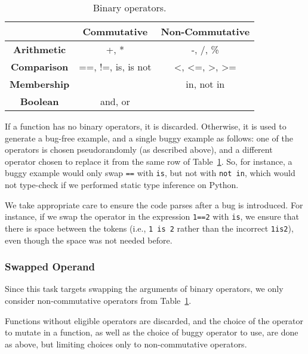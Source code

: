 \documentclass{article}
\begin{document}
\begin{table}
\centering
\begin{tabular}{|c|c|c|}
\hline
                    & \textbf{Commutative} & \textbf{Non-Commutative}                                   \\ \hline
\textbf{Arithmetic} & +, *                 & -, /, \%                                                   \\
\textbf{Comparison} & ==, !=, is, is not   & \textless{}, \textless{}=, \textgreater{}, \textgreater{}= \\
\textbf{Membership} &                      & in, not in                                                 \\
\textbf{Boolean}    & and, or              &                                                            \\ \hline
\end{tabular}
\caption{Binary operators.}
\label{tab:binaryoperators}
\end{table}

If a function has no binary operators, it is discarded. Otherwise, it is used to generate a bug-free example, and a single buggy example as follows: one of the operators is chosen pseudorandomly (as described above), and a different operator chosen to replace it from the same row of  Table~\ref{tab:binaryoperators}. So, for instance, a buggy example would only swap \texttt{==} with \texttt{is}, but not with \texttt{not in}, which would not type-check if we performed static type inference on Python.

We take appropriate care to ensure the code parses after a bug is introduced. For instance, if we swap the operator in the expression \texttt{1==2} with \texttt{is}, we ensure that there is space between the tokens (i.e., \texttt{1 is 2} rather than the incorrect \texttt{1is2}), even though the space  was not needed before.

\subsubsection{Swapped Operand}
Since this task targets swapping the arguments of binary operators, we only consider non-commutative operators from Table~\ref{tab:binaryoperators}.

Functions without eligible operators are discarded, and the choice of the operator to mutate in a function, as well as the choice of buggy operator to use, are done as above, but limiting choices only to non-commutative operators.
\end{document}
